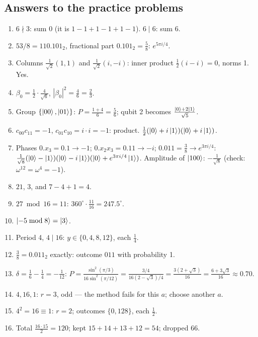\documentclass[11pt,a4paper,openany]{book}
\begin{document}
\newpage
\subsection*{Answers to the practice problems}
\begin{enumerate}[label=\textbf{P\arabic*.}, leftmargin=2.6em, itemsep=3pt]
\item $6 \nmid 3$: sum $0$ (it is $1 - 1 + 1 - 1 + 1 - 1$). $6 \mid 6$: sum $6$.
\item $53/8 = 110.101_2$, fractional part $0.101_2 = \frac58$: $e^{5\pi i/4}$.
\item Columns $\frac{1}{\sqrt2}(1,1)$ and $\frac{1}{\sqrt2}(i,-i)$: inner product $\frac12(i - i) = 0$, norms 1. Yes.
\item $\beta_0 = \frac12\cdot\frac{4}{\sqrt6}$, $|\beta_0|^2 = \frac{4}{6} = \frac23$.
\item Group $\{\ket{00},\ket{01}\}$: $P = \frac{1 + 4}{6} = \frac56$; qubit 2 becomes $\frac{\ket0 + 2\ket1}{\sqrt5}$.
\item $c_{00}c_{11} = -1$, $c_{01}c_{10} = i\cdot i = -1$: product. $\frac12(\ket0 + i\ket1)(\ket0 + i\ket1)$.
\item Phases $0.x_3 = 0.1 \to -1$; $0.x_2x_3 = 0.11 \to -i$; $0.011 = \frac38 \to e^{3\pi i/4}$:
      $\frac{1}{\sqrt8}(\ket0 - \ket1)(\ket0 - i\ket1)(\ket0 + e^{3\pi i/4}\ket1)$. Amplitude of $\ket{100}$: $-\frac{1}{\sqrt8}$ (check: $\omega^{12} = \omega^4 = -1$).
\item $21$, $3$, and $7 - 4 + 1 = 4$.
\item $27 \bmod 16 = 11$: $360^\circ\cdot\frac{11}{16} = 247.5^\circ$.
\item $\ket{-5 \bmod 8} = \ket3$.
\item Period 4, $4 \mid 16$: $y \in \{0, 4, 8, 12\}$, each $\frac14$.
\item $\frac38 = 0.011_2$ exactly: outcome $011$ with probability 1.
\item $\delta = \frac16 - \frac14 = -\frac{1}{12}$: $P = \frac{\sin^2(\pi/3)}{16\sin^2(\pi/12)} = \frac{3/4}{16(2-\sqrt3)/4} = \frac{3(2+\sqrt3)}{16} = \frac{6 + 3\sqrt3}{16} \approx 0.70$.
\item $4, 16, 1$: $r = 3$, odd --- the method fails for this $a$; choose another $a$.
\item $4^2 = 16 \equiv 1$: $r = 2$; outcomes $\{0, 128\}$, each $\frac12$.
\item Total $\frac{16\cdot15}{2} = 120$; kept $15 + 14 + 13 + 12 = 54$; dropped $66$.
\end{enumerate}
\end{document}
